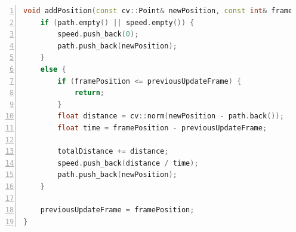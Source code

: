 \begin{codewrapper}
\begin{lstlisting}[language=C++, numbers=left, caption={Egy golyó megtett távolságának, útvonalának és sebességének kiszámolása.}, label={cod:calculate_analyzed}]
void addPosition(const cv::Point& newPosition, const int& framePosition) {
    if (path.empty() || speed.empty()) {
        speed.push_back(0);
        path.push_back(newPosition);
    }
    else {
        if (framePosition <= previousUpdateFrame) {
            return;
        }
        float distance = cv::norm(newPosition - path.back());
        float time = framePosition - previousUpdateFrame;

        totalDistance += distance;
        speed.push_back(distance / time);
        path.push_back(newPosition);
    }
    
    previousUpdateFrame = framePosition;
}
\end{lstlisting}
\end{codewrapper}

